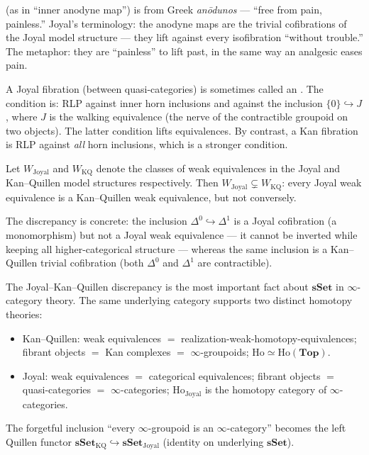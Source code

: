 \begin{nameorigin}
 (as in ``inner anodyne map'') is from Greek
\emph{anōdunos} — ``free from pain, painless.'' Joyal's terminology:
the anodyne maps are the trivial cofibrations of the Joyal model
structure — they lift against every isofibration ``without trouble.''
The metaphor: they are ``painless'' to lift past, in the same way an
analgesic eases pain.
\end{nameorigin}

\begin{remark}
\label{rem:joyal-vs-kan-fib}
A Joyal fibration (between quasi-categories) is sometimes called an
. The condition is: RLP against inner horn inclusions
and against the inclusion $\{0\} \hookrightarrow J$, where $J$ is the
walking equivalence (the nerve of the contractible groupoid on two
objects). The latter condition lifts equivalences. By contrast, a Kan
fibration is RLP against \emph{all} horn inclusions, which is a stronger
condition.
\end{remark}

\begin{theorem}
\label{thm:joyal-vs-kan-we}
Let $W_{\mathrm{Joyal}}$ and $W_{\mathrm{KQ}}$ denote the classes of
weak equivalences in the Joyal and Kan–Quillen model structures
respectively. Then $W_{\mathrm{Joyal}} \subsetneq W_{\mathrm{KQ}}$:
every Joyal weak equivalence is a Kan–Quillen weak equivalence, but not
conversely.

The discrepancy is concrete: the inclusion $\Delta^0 \hookrightarrow
\Delta^1$ is a Joyal cofibration (a monomorphism) but not a Joyal weak
equivalence — it cannot be inverted while keeping all higher-categorical
structure — whereas the same inclusion is a Kan–Quillen trivial cofibration
(both $\Delta^0$ and $\Delta^1$ are contractible).
\end{theorem}

\begin{remark}
The Joyal–Kan–Quillen discrepancy is the most important fact about
$\mathbf{sSet}$ in $\infty$-category theory. The same underlying category
supports two distinct homotopy theories:
\begin{itemize}
  \item Kan–Quillen: weak equivalences $=$ realization-weak-homotopy-equivalences;
        fibrant objects $=$ Kan complexes $=$ $\infty$-groupoids;
        $\mathrm{Ho} \simeq \mathrm{Ho}(\mathbf{Top})$.
  \item Joyal: weak equivalences $=$ categorical equivalences;
        fibrant objects $=$ quasi-categories $=$ $\infty$-categories;
        $\mathrm{Ho}_\mathrm{Joyal}$ is the homotopy category of $\infty$-categories.
\end{itemize}
The forgetful inclusion ``every $\infty$-groupoid is an $\infty$-category''
becomes the left Quillen functor $\mathbf{sSet}_{\mathrm{KQ}}
\hookrightarrow \mathbf{sSet}_{\mathrm{Joyal}}$ (identity on underlying
$\mathbf{sSet}$).
\end{remark}


